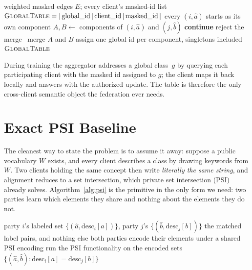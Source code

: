 \documentclass[conference]{IEEEtran}
\newcommand{\ExactPSI}{\textsc{ExactPSI}}
\newcommand{\GlobalTable}{\textsc{GlobalTable}}
\begin{document}
\begin{algorithm}[t]
\caption{Global table from masked edges (shared stage)}
\label{alg:global}
\begin{algorithmic}[1]
\Require weighted masked edges $E$; every client's masked-id list
\Ensure $\GlobalTable=|\,\text{global\_id}\,|\,\text{client\_id}\,|\,\text{masked\_id}\,|$
  \State every $(i,\hat a)$ starts as its own component
    \State $A,B\gets$ components of $(i,\hat a)$ and $(j,\hat b)$
     \State \textbf{continue} \EndIf
      \State reject the merge 
    \Else\ \State merge $A$ and $B$
    \EndIf
  \EndFor
  \State assign one global id per component, singletons included
  \State \Return $\GlobalTable$
\end{algorithmic}
\end{algorithm}

During training the aggregator addresses a global class~$g$ by querying
each participating client with the masked id assigned to $g$; the client
maps it back locally and answers with the authorized update. The table
is therefore the only cross-client semantic object the federation ever
needs.

\section{Exact PSI Baseline}
\label{sec:exact}

The cleanest way to state the problem is to assume it away: suppose a
public vocabulary $W$ exists, and every client describes a class by
drawing keywords from $W$. Two clients holding the same concept then
write \emph{literally the same string}, and alignment reduces to a set
intersection, which private set intersection (PSI) already solves.
Algorithm~\ref{alg:psi} is the primitive in the only form we need: two
parties learn which elements they share and nothing about the elements
they do not.

\begin{algorithm}[t]
\caption{$\ExactPSI$ (primitive, abstract)}
\label{alg:psi}
\begin{algorithmic}[1]
\Require party $i$'s labeled set $\{(\hat a,\mathrm{desc}_i[a])\}$, party $j$'s $\{(\hat b,\mathrm{desc}_j[b])\}$
\Ensure the matched label pairs, and nothing else
  \State both parties encode their elements under a shared PSI encoding
  \State run the PSI functionality on the encoded sets
  \State \Return $\{(\hat a,\hat b): \mathrm{desc}_i[a]=\mathrm{desc}_j[b]\}$
  \Statex {}
\end{algorithmic}
\end{algorithm}
\end{document}
